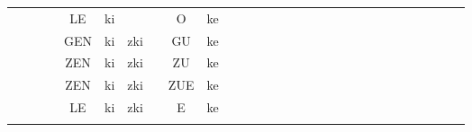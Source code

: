 \documentclass[10pt, a3paper, landscape]{article}
\begin{document}
\begin{table}
\begin{tabular}{|c|c|c|ccccccccc|c|c|cccccccc|ccccccc|}
                              &                                     &                      &    & LE  & ki                        &     &    & O    & ke &    &                      &                      &                      &    &     &    &   &    &     &      &                      &    &     &        &           &    &     &                       \\
                              &                                     &                      &    & GEN & ki                        & zki &    & GU   & ke &    &                      &                      &                      &    &     &    &   &    &     &      &                      &    &     &        &           &    &     &                       \\
                              &                                     &                      &    & ZEN & ki                        & zki &    & ZU   & ke &    &                      &                      &                      &    &     &    &   &    &     &      &                      &    &     &        &           &    &     &                       \\
                              &                                     &                      &    & ZEN & ki                        & zki &    & ZUE  & ke &    &                      &                      &                      &    &     &    &   &    &     &      &                      &    &     &        &           &    &     &                       \\
                              &                                     &                      &    & LE  & ki                        & zki &    & E    & ke &    &                      &                      &                      &    &     &    &   &    &     &      &                      &    &     &        &           &    &     &                       \\ 
\hline
\multicolumn{1}{c}{}          & \multicolumn{1}{c}{}                & \multicolumn{1}{c}{} &    &     &                           &     &    &      &    &    & \multicolumn{1}{c}{} &                      & \multicolumn{1}{c}{} &    &     &    &   &    &     &      & \multicolumn{1}{c}{} &    &     &        &           &    &     & \multicolumn{1}{c}{} 
\end{tabular}
\end{table}
\end{document}
